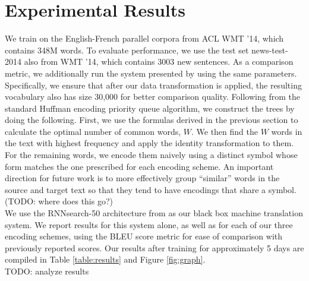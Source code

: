 \section{Experimental Results}
\label{sec:exp}

We train on the English-French parallel corpora from ACL WMT '14, which contains
348M words. To evaluate performance, we use the test set news-test-2014 also from
WMT '14, which contains 3003 new sentences. As a comparison metric, we additionally run the system presented by
 using the same parameters. Specifically, we ensure
that after our data transformation is applied, the resulting vocabulary also has size
30,000 for better comparison quality. Following from the standard Huffman encoding
priority queue algorithm, we construct the trees by doing the following. First, we use
the formulas derived in the previous section to calculate the optimal number of
common words, $W$. We then find the $W$ words in the text with highest frequency and
apply the identity transformation to them. For the remaining words, we encode them
naively using a distinct symbol whose form matches the one prescribed for each
encoding scheme. An important direction for future work is to more effectively
group ``similar'' words in the source and target text so that they tend to have
encodings that share a symbol. (TODO: where does this go?)\\

We use the RNNsearch-50 architecture from  as
our black box machine translation system. We report results for this system alone,
as well as for each of our three encoding schemes, using the BLEU score metric for
ease of comparison with previously reported scores. Our results after training
for approximately 5 days are compiled in Table \ref{table:results} and Figure \ref{fig:graph}.\\

TODO: analyze results

\begin{table}
  \centering
  \vspace{8pt}
  \caption{BLEU scores on detokenized test set for various encoding
    schemes after training for 5 days.}
  \label{table:results}
\end{table}

